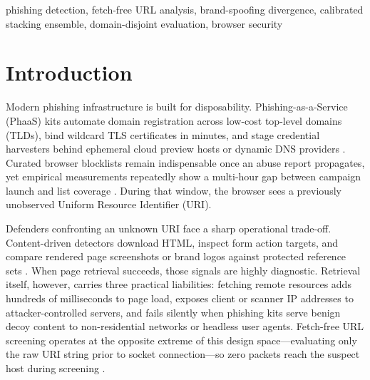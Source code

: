 \documentclass[conference]{IEEEtran}
\begin{document}
\begin{IEEEkeywords}
phishing detection, fetch-free URL analysis, brand-spoofing divergence, calibrated stacking ensemble, domain-disjoint evaluation, browser security
\end{IEEEkeywords}

\section{Introduction}
Modern phishing infrastructure is built for disposability. Phishing-as-a-Service (PhaaS) kits automate domain registration across low-cost top-level domains (TLDs), bind wildcard TLS certificates in minutes, and stage credential harvesters behind ephemeral cloud preview hosts or dynamic DNS providers \cite{sahoo2017,prasad2024}. Curated browser blocklists remain indispensable once an abuse report propagates, yet empirical measurements repeatedly show a multi-hour gap between campaign launch and list coverage \cite{sheng2009}. During that window, the browser sees a previously unobserved Uniform Resource Identifier (URI).

Defenders confronting an unknown URI face a sharp operational trade-off. Content-driven detectors download HTML, inspect form action targets, and compare rendered page screenshots or brand logos against protected reference sets \cite{xiang2011,marchal2017,abdelnabi2020}. When page retrieval succeeds, those signals are highly diagnostic. Retrieval itself, however, carries three practical liabilities: fetching remote resources adds hundreds of milliseconds to page load, exposes client or scanner IP addresses to attacker-controlled servers, and fails silently when phishing kits serve benign decoy content to non-residential networks or headless user agents. Fetch-free URL screening operates at the opposite extreme of this design space---evaluating only the raw URI string prior to socket connection---so zero packets reach the suspect host during screening \cite{ma2009,sahingoz2019}.
\end{document}
